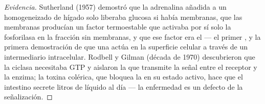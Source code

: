 \begin{proof}[Evidencia]
Sutherland (1957) demostró que la adrenalina añadida a un homogeneizado
de hígado solo liberaba glucosa si había membranas, que las membranas
producían un factor termoestable que activaba por sí solo la fosforilasa
en la fracción sin membranas, y que ese factor era el  --- el
primer , y la primera demostración de que una 
actúa en la superficie celular a través de un intermediario intracelular.
Rodbell y Gilman (década de 1970) descubrieron que la ciclasa necesitaba
GTP y aislaron la  que transmite la señal entre el receptor y
la enzima; la toxina colérica, que bloquea la  en su estado
activo, hace que el intestino secrete litros de líquido al día --- la
enfermedad es un defecto de la señalización.
\end{proof}

